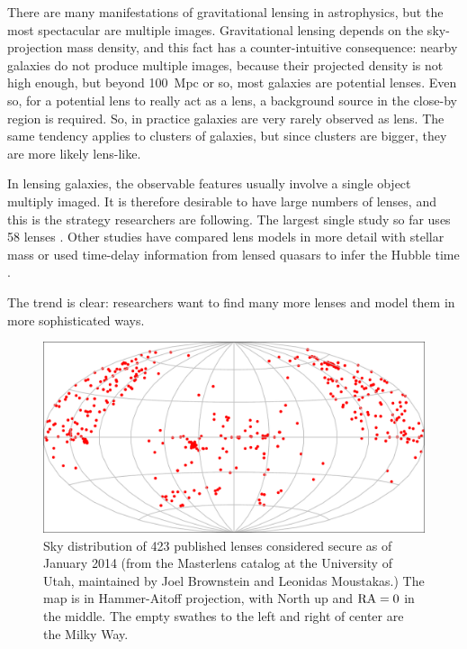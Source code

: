 There are many manifestations of gravitational lensing in astrophysics,
but the most spectacular are multiple images.  Gravitational lensing
depends on the sky-projection mass density, and this fact has a
counter-intuitive consequence: nearby galaxies do not produce multiple
images, because their projected density is not high enough, but beyond
100~Mpc or so, most galaxies are potential lenses.  Even so, for a
potential lens to really act as a lens, a background source in the close-by
region is required.  So, in practice galaxies are very rarely observed
as lens.  The same tendency applies to clusters of galaxies, but since
clusters are bigger, they are more likely lens-like.

In lensing galaxies, the observable features usually involve a single
object multiply imaged.  It is therefore desirable to have large
numbers of lenses, and this is the strategy researchers are following.  The
largest single study so far uses 58 lenses \citep{2009ApJ...703L..51K}.
Other studies have compared lens models in more detail with stellar
mass \citep{2011ApJ...740...97L} or used time-delay information from
lensed quasars to infer the Hubble time
\citep{2008ApJ...679...17C,2010ApJ...712.1378P}.

The trend is clear: researchers want to find many more lenses and
model them in more sophisticated ways.

\begin{figure}
\centering
\includegraphics[width=0.9\hsize]{fig/lenssky}
\caption{Sky distribution of 423 published lenses considered secure as
  of January 2014 (from the Masterlens catalog at the University of
  Utah, maintained by Joel Brownstein and Leonidas Moustakas.) The map
  is in Hammer-Aitoff projection, with North up and $\rm RA=0$ in the
  middle.  The empty swathes to the left and right of center are the
  Milky Way.}
\label{fig:masterlens}
\end{figure}

